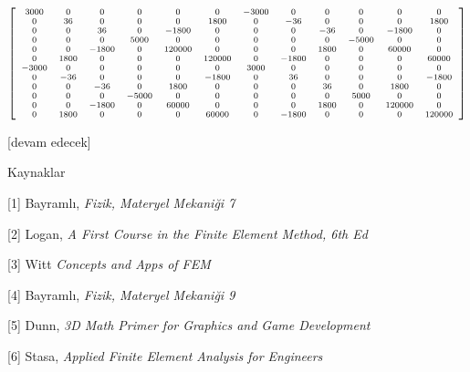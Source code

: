 \documentclass[12pt,fleqn]{article}\usepackage{../../common}
\begin{document}
$$
{\scriptsize
\left[\begin{array}{cccccccccccc}3000 & 0 & 0 & 0 & 0 & 0 & -3000 & 0 & 0 & 0 & 0 & 0\\0 & 36 & 0 & 0 & 0 & 1800 & 0 & -36 & 0 & 0 & 0 & 1800\\0 & 0 & 36 & 0 & -1800 & 0 & 0 & 0 & -36 & 0 & -1800 & 0\\0 & 0 & 0 & 5000 & 0 & 0 & 0 & 0 & 0 & -5000 & 0 & 0\\0 & 0 & -1800 & 0 & 120000 & 0 & 0 & 0 & 1800 & 0 & 60000 & 0\\0 & 1800 & 0 & 0 & 0 & 120000 & 0 & -1800 & 0 & 0 & 0 & 60000\\-3000 & 0 & 0 & 0 & 0 & 0 & 3000 & 0 & 0 & 0 & 0 & 0\\0 & -36 & 0 & 0 & 0 & -1800 & 0 & 36 & 0 & 0 & 0 & -1800\\0 & 0 & -36 & 0 & 1800 & 0 & 0 & 0 & 36 & 0 & 1800 & 0\\0 & 0 & 0 & -5000 & 0 & 0 & 0 & 0 & 0 & 5000 & 0 & 0\\0 & 0 & -1800 & 0 & 60000 & 0 & 0 & 0 & 1800 & 0 & 120000 & 0\\0 & 1800 & 0 & 0 & 0 & 60000 & 0 & -1800 & 0 & 0 & 0 & 120000\end{array}\right]
}
$$










[devam edecek]

Kaynaklar

[1] Bayramlı, {\em Fizik, Materyel Mekaniği 7}

[2] Logan, {\em A First Course in the Finite Element Method, 6th Ed}

[3] Witt {\em Concepts and Apps of FEM}

[4] Bayramlı, {\em Fizik, Materyel Mekaniği 9}

[5] Dunn, {\em 3D Math Primer for Graphics and Game Development}

[6] Stasa, {\em Applied Finite Element Analysis for Engineers}
\end{document}

